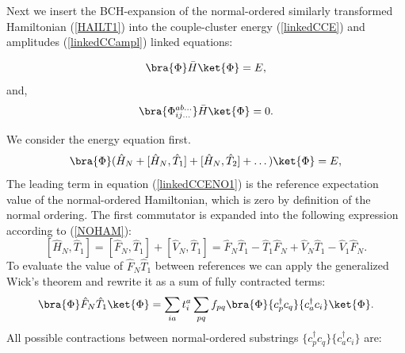 \documentclass[twoside,english]{uiofysmaster}
\begin{document}
Next we insert the BCH-expansion of the normal-ordered similarly transformed Hamiltonian (\ref{HAILT1}) into the couple-cluster energy (\ref{linkedCCE}) and amplitudes (\ref{linkedCCampl}) linked equations:

\begin{equation}\label{linkedCCENO}
\bra{\Phi}\bar{H}\ket{\Phi} = E,
\end{equation}
and,
\begin{equation}\label{linkedCCamplNO}
\bra{\Phi_{ij\dots}^{ab\dots}}\bar{H}\ket{\Phi} = 0.
\end{equation}

We consider the energy equation first. 
\begin{equation}\label{linkedCCENO1}
\bra{\Phi}	(\hat{H}_N + [\hat{H}_N,\hat{T}_1] + [\hat{H}_N,\hat{T}_2] + \dots)	\ket{\Phi} = E,
\end{equation}
The leading term in equation (\ref{linkedCCENO1}) is the reference expectation value of the normal-ordered Hamiltonian, which is zero by definition of the normal ordering. The first commutator is expanded into the following expression according to (\ref{NOHAM}):
\begin{equation}\label{commstrings}
	[\hat{H}_N,\hat{T}_1] =  [\hat{F}_N,\hat{T}_1] + [\hat{V}_N,\hat{T}_1] =  \hat{F}_N\hat{T}_1 - \hat{T}_1 \hat{F}_N + \hat{V}_N\hat{T}_1 - \hat{V}_1 \hat{F}_N.
\end{equation}
To evaluate the value of $\hat{F}_N\hat{T}_1$ between references we can apply the generalized Wick's theorem and rewrite it as a sum of fully contracted terms:
\begin{align}
\bra{\Phi}\hat{F}_N\hat{T}_1\ket{\Phi} = \sum_{ia}t_{i}^{a} \sum_{pq} f_{pq} \bra{\Phi} \{c^\dagger_p c_q\}\{ c^\dag_{a} c_{i}\} \ket{\Phi}.
\end{align}
All possible contractions between normal-ordered substrings $\{c^\dagger_pc_q\}        \{ c^\dag_{a} c_{i}\}$ are:
\end{document}
